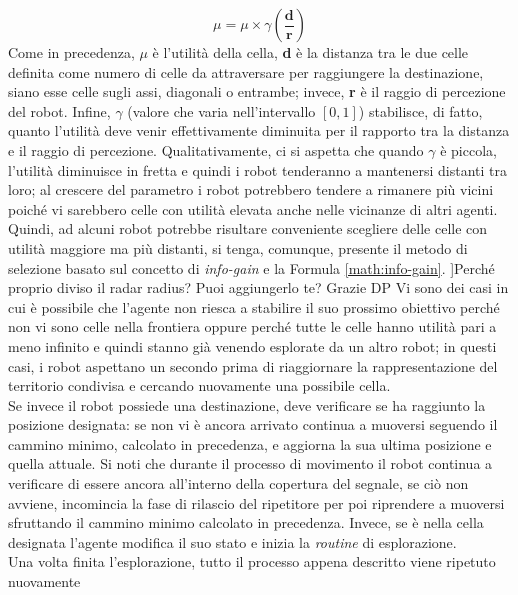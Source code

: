 \begin{equation}
	\label{math:utility-red}
	\mu = \mu\times\gamma\left(\frac{\textbf{d}}{\textbf{r}}\right)
\end{equation}
Come in precedenza, $\mu$ è l'utilità della cella, \textbf{d} è la distanza tra le due celle definita come numero di celle da attraversare per raggiungere la destinazione, siano esse celle sugli assi, diagonali o entrambe; invece, \textbf{r} è il raggio di percezione del robot.
Infine, $\gamma$ (valore che varia nell'intervallo $\left[0, 1\right]$) stabilisce, di fatto, quanto l'utilità deve venir effettivamente diminuita per il rapporto tra la distanza e il raggio di percezione. 
Qualitativamente, ci si aspetta che quando $\gamma$ è piccola, l'utilità diminuisce in fretta e quindi i robot tenderanno a mantenersi distanti tra loro; al crescere del parametro i robot potrebbero tendere a rimanere più vicini poiché vi sarebbero celle con utilità elevata anche nelle vicinanze di altri agenti.
Quindi, ad alcuni robot potrebbe risultare conveniente scegliere delle celle con utilità maggiore ma più distanti, si tenga, comunque, presente il metodo di selezione basato sul concetto di \textit{info-gain} e la Formula \ref{math:info-gain}.
\todo[inline]]{Perché proprio diviso il radar radius? Puoi aggiungerlo te? Grazie DP}
Vi sono dei casi in cui è possibile che l'agente non riesca a stabilire il suo prossimo obiettivo perché non vi sono celle nella frontiera oppure perché tutte le celle hanno utilità pari a meno infinito e quindi stanno già venendo esplorate da un altro robot; in questi casi, i robot aspettano un secondo prima di riaggiornare la rappresentazione del territorio condivisa e cercando nuovamente una possibile cella.\\
Se invece il robot possiede una destinazione, deve verificare se ha raggiunto la posizione designata: se non vi è ancora arrivato continua a muoversi seguendo il cammino minimo, calcolato in precedenza, e aggiorna la sua ultima posizione e quella attuale.
Si noti che durante il processo di movimento il robot continua a verificare di essere ancora all'interno della copertura del segnale, se ciò non avviene, incomincia la fase di rilascio del ripetitore per poi riprendere a muoversi sfruttando il cammino minimo calcolato in precedenza.
Invece, se è nella cella designata l'agente modifica il suo stato e inizia la \textit{routine} di esplorazione.\\
Una volta finita l'esplorazione, tutto il processo appena descritto viene ripetuto nuovamente

